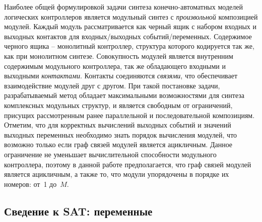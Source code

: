 Наиболее общей формулировкой задачи синтеза конечно-автоматных моделей логических контроллеров является модульный синтез с \textit{произвольной} композицией модулей.
Каждый модуль рассматривается как черный ящик с набором входных и выходных контактов для входных/выходных событий/переменных. Содержимое черного ящика \--- монолитный контроллер, структура которого кодируется так же, как при монолитном синтезе.
Совокупность модулей является внутренним содержимым модульного контроллера, так же обладающего входными и выходными \textit{контактами}.
Контакты соединяются \textit{связями}, что обеспечивает взаимодействие модулей друг с другом.
При такой постановке задачи, разрабатываемый метод обладает максимальными возможностями для синтеза комплексных модульных структур, и является свободным от ограничений, присущих рассмотренным ранее параллельной и последовательной композициям.
Отметим, что для корректных вычислений выходных событий и значений выходных переменных необходимо знать порядок вычисления модулей, что возможно только если граф связей модулей является ацикличным.
Данное ограничение не уменьшает вычислительной способности модульного контроллера, поэтому в данной работе предполагается, что граф связей модулей является ацикличным, а также то, что модули упорядочены в порядке их номеров: от~1 до~$M$.



\subsection{Сведение к SAT: переменные}%
\label{sub:synth-modular-arbitrary-variables}

